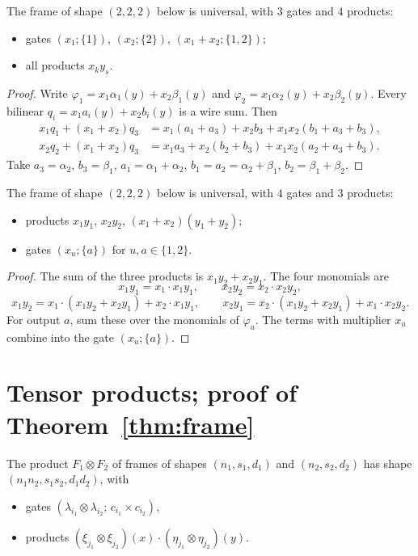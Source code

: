 \begin{lemma}[type A]\label{lem:A}
The frame of shape $(2,2,2)$ below is universal, with $3$ gates and $4$ products:
\begin{itemize}
\item gates $(x_1;\{1\})$, $(x_2;\{2\})$, $(x_1+x_2;\{1,2\})$;
\item all products $x_ky_s$.
\end{itemize}
\end{lemma}
\begin{proof}
Write $\varphi_1=x_1\alpha_1(y)+x_2\beta_1(y)$ and $\varphi_2=x_1\alpha_2(y)+x_2\beta_2(y)$. Every bilinear $q_i=x_1a_i(y)+x_2b_i(y)$ is a wire sum. Then
\begin{align*}
x_1q_1+(x_1+x_2)q_3&=x_1(a_1+a_3)+x_2b_3+x_1x_2(b_1+a_3+b_3),\\
x_2q_2+(x_1+x_2)q_3&=x_1a_3+x_2(b_2+b_3)+x_1x_2(a_2+a_3+b_3).
\end{align*}
Take $a_3=\alpha_2$, $b_3=\beta_1$, $a_1=\alpha_1+\alpha_2$, $b_1=a_2=\alpha_2+\beta_1$, $b_2=\beta_1+\beta_2$.
\end{proof}

\begin{lemma}[type B]\label{lem:B}
The frame of shape $(2,2,2)$ below is universal, with $4$ gates and $3$ products:
\begin{itemize}
\item products $x_1y_1$, $x_2y_2$, $(x_1+x_2)(y_1+y_2)$;
\item gates $(x_u;\{a\})$ for $u,a\in\{1,2\}$.
\end{itemize}
\end{lemma}
\begin{proof}
The sum of the three products is $x_1y_2+x_2y_1$. The four monomials are
\[
x_1y_1=x_1\cdot x_1y_1,\qquad x_2y_2=x_2\cdot x_2y_2,
\]
\[
x_1y_2=x_1\cdot(x_1y_2+x_2y_1)+x_2\cdot x_1y_1,\qquad x_2y_1=x_2\cdot(x_1y_2+x_2y_1)+x_1\cdot x_2y_2 .
\]
For output $a$, sum these over the monomials of $\varphi_a$. The terms with multiplier $x_u$ combine into the gate $(x_u;\{a\})$.
\end{proof}

\section{Tensor products; proof of Theorem~\ref{thm:frame}}

The product $F_1\otimes F_2$ of frames of shapes $(n_1,s_1,d_1)$ and $(n_2,s_2,d_2)$ has shape $(n_1n_2,s_1s_2,d_1d_2)$, with
\begin{itemize}
\item gates $(\lambda_{i_1}\otimes\lambda_{i_2};\,c_{i_1}\times c_{i_2})$,
\item products $(\xi_{j_1}\otimes\xi_{j_2})(x)\cdot(\eta_{j_1}\otimes\eta_{j_2})(y)$.
\end{itemize}

